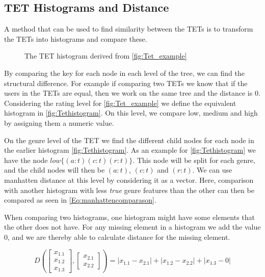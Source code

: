 \subsection{TET Histograms and Distance}\label{Subsec:TET_historgram_and_distance}
	A method that can be used to find similarity between the TETs is to transform the TETs into histograms and compare these\cite{JAEGER201330}.
	\begin{figure}[H]
		\centering
		\begin{adjustbox}{width=0.5\textwidth}
			
		\end{adjustbox}
		\caption{The TET histogram derived from \autoref{fig:Tet_example}}
		\label{fig:Tethistogram}
	\end{figure}

	By comparing the key for each node in each level of the tree, we can find the structural difference. For example if comparing two TETs we know that if the users in the TETs are equal, then we work on the same tree and the distance is $0$. Considering the rating level for \autoref{fig:Tet_example} we define the equivalent histogram in \autoref{fig:Tethistogram}. On this level, we compare low, medium and high by assigning them a numeric value.

	On the genre level of the TET we find the different child nodes for each node in the earlier histogram \autoref{fig:Tethistogram}. As an example for  \autoref{fig:Tethistogram} we have the node  $low\{(a:t)(c:t)(r:t)\}$. This node will be split for each genre,  and the child nodes will then be  $(a:t)$, $(c:t)$ and $(r:t)$. We can use manhatten distance at this level by considering it as a vector. Here, comparison with another histogram with less \textit{true} genre features than the other can then be compared as seen in \autoref{Eq:manhattencomparason}\cite{singh2013k}.

	When comparing two histograms, one histogram might have some elements that the other does not have. For any missing element in a histogram we add the value $0$, and we are thereby able to calculate distance for the missing element.

	\begin{equation}\label{Eq:manhattencomparason}
	D(\begin{bmatrix}
	x_{1.1} \\
	x_{1.2} \\
	x_{1.3}
	\end{bmatrix},
	\begin{bmatrix}
	x_{2.1} \\
	x_{2.2}
	\end{bmatrix})= |x_{1.1} - x_{2.1}| + |x_{1.2} - x_{2.2}| + |x_{1.3} - 0|
	\end{equation}

